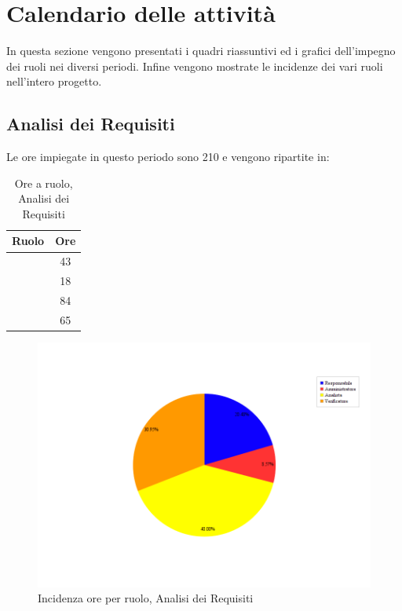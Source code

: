 \section{Calendario delle attività}
In questa sezione vengono presentati i quadri riassuntivi ed i grafici dell'impegno dei ruoli nei diversi periodi. Infine vengono mostrate le incidenze dei vari ruoli nell'intero progetto.

\subsection{Analisi dei Requisiti}
Le ore impiegate in questo periodo sono 210 e vengono ripartite in:
\begin{table}[H]
	\begin{center}
		\begin{tabular}{|c|c|}
			\hline
			\textbf{Ruolo}	& \textbf{Ore} \\
			\hline
			\Res	&	43	\\
			\hline
			\Amm	&	18	\\
			\hline
			\Ana		&	84	\\
			\hline
			\Ver	&	65	\\
			\hline
		\end{tabular}
	\end{center}
	\caption{Ore a ruolo, Analisi dei Requisiti}
\end{table}

\begin{figure}[H]
	\centering
	\includegraphics[scale=0.3]{immagini/Grafi/OreRuoloRR}
	\caption{Incidenza ore per ruolo, Analisi dei Requisiti}
\end{figure}


